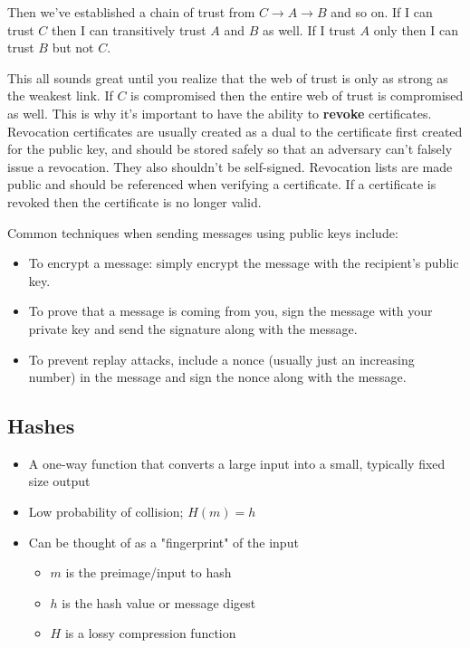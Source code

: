 \documentclass[../notes.tex]{subfiles}
\begin{document}
Then we've established a chain of trust from $ C \to  A \to  B$ and so on. If I can trust $ C $ then I can transitively trust $ A  $ and $ B  $ as well. If I trust $ A $ only then I can trust $ B $ but not $ C $. 


This all sounds great until you realize that the web of trust is only as strong as the weakest link. If $ C $ is compromised then the entire web of trust is compromised as well. 
This is why it's important to have the ability to \textbf{revoke} certificates.
Revocation certificates are usually created as a dual to the certificate first created for the public key, and should be stored safely so that an adversary can't falsely issue a revocation. They also shouldn't be self-signed.
Revocation lists are made public and should be referenced when verifying a certificate. If a certificate is revoked then the certificate is no longer valid.





Common techniques when sending messages using public keys include:

\begin{itemize}
    \item To encrypt a message: simply encrypt the message with the recipient's public key.
    \item To prove that a message is coming from you, sign the message with your private key and send the signature along with the message.
    \item To prevent replay attacks, include a nonce (usually just an increasing number) in the message and sign the nonce along with the message.
\end{itemize}


\subsection{Hashes}


\begin{itemize}
    \item A one-way function that converts a large input into a small, typically fixed size output
    \item Low probability of collision; $ H(m) = h $
    \item Can be thought of as a "fingerprint" of the input
    \begin{itemize}
        \item $ m $ is the preimage/input to hash
        \item $ h $ is the hash value or message digest
        \item $ H $ is a lossy compression function
    \end{itemize}
\end{itemize}
\end{document}

